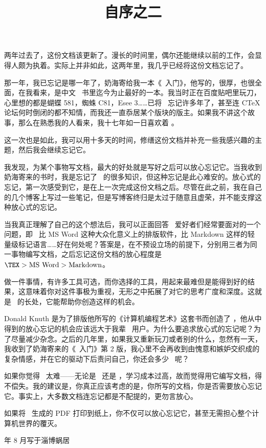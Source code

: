 \title{自序之二}

两年过去了，这份文档该更新了。漫长的时间里，偶尔还能继续以前的工作，会显得人颇为执着。实际上并非如此，这两年里，我几乎已经将这份文档忘记了。

那一年，我已忘记是哪一年了，奶海寄给我一本《\LATEX\ 入门》，他写的，很厚，也很全面，在我看来，是中文 \LATEX\ 书里迄今为止最好的一本。我当时正在百度贴吧里玩刀，心里想的都是蝴蝶 581，蜘蛛 C81，Esee 3……已将 \TEX\ 忘记许多年了，甚至连 CTeX 论坛何时倒闭的都不知情，而我还一直忝居某个版块的版主。如果我不讲这个故事，那么在熟悉我的人看来，我十七年如一日喜欢着 \CONTEXT。

这一次也是如此，我可以用十多天的时间，修缮这份文档并补充一些我感兴趣的主题，然后我会继续忘记它。

我发现，为某个事物写文档，最大的好处就是写好之后可以放心忘记它。当我收到奶海寄来的书时，我是忘记了 \CONTEXT\ 的很多知识，但这种忘记是此心难安的。放心式的忘记，第一次感受到它，是在上一次完成这份文档之后。尽管在此之前，我在自己的几个博客上写过一些笔记，但是写博客终归是太过于随意且虚荣，并不能支撑这种放心式的忘记。

当我真正理解了自己的这个想法后，我可以正面回答 \TEX\ 爱好者们经常要面对的一个问题，即 \TEX\ 比 MS Word 这种大众化意义上的排版软件，比 Markdown 这样的轻量级标记语言……好在何处呢？答案是，在不预设立场的前提下，分别用三者为同一事物编写文档，之后忘记这份文档的放心程度是 $\text{\TEX} > \text{MS Word} > \text{Markdown}$。

做一件事情，有许多工具可选，而你选择的工具，用起来最难但是能得到好的结果，这意味着你对这件事极为重视，无形之中拓展了对它的思考广度和深度。这就是 \TEX\ 的长处，它能帮助你创造这样的机会。

Donald Knuth 是为了排版他所写的《计算机编程艺术》这套书而创造了 \TEX，他从中得到的放心忘记的机会应该远大于我辈 \TEX\ 用户。为什么要追求放心式的忘记呢？为了尽量减少杂念。之后的几年里，如果我又重新玩刀或者别的什么，忽然有一天，我收到了奶海寄来的《\LATEX\ 入门》第 2 版，我心里不会再收到由愧意和嫉妒交织成的复杂情感，并在它的驱动下后责问自己，你还会多少 \CONTEXT\ 呢？

如果你觉得 \TEX\ 太难——无论是 \LATEX\ 还是 \CONTEXT，学习成本过高，故而觉得用它编写文档，得不偿失。我的建议是，你真正应该考虑的是，你所写的文档，你是否需要放心忘记它。事实上，大多数文档连忘记都是不配提的，更勿言放心。

如果将 \TEX\ 生成的 PDF 打印到纸上，你不仅可以放心忘记它，甚至无需担心整个计算机世界的覆灭。

\vfill
{} 年 8 月写于淄博蜗居
\stopalignment
